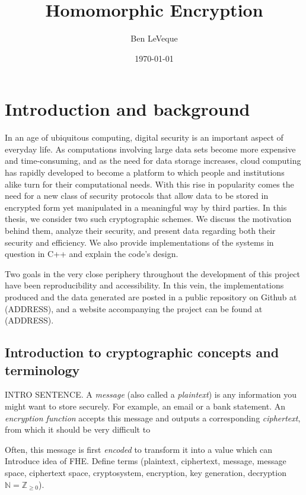 \documentclass[11pt]{report}
\title{Homomorphic Encryption}
\author{Ben LeVeque}
\date{\today}
\newcommand{\Z}{\mathbb{Z}}
\newcommand{\N}{\mathbb{N}}
\begin{document}
\maketitle


\tableofcontents

\newpage

\section[Intro]{Introduction and background}

In an age of ubiquitous computing, digital security is an important aspect of everyday life. As computations involving large data sets become more expensive and time-consuming, and as the need for data storage increases, cloud computing has rapidly developed to become a platform to which people and institutions alike turn for their computational needs. With this rise in popularity comes the need for a new class of security protocols that allow data to be stored in encrypted form yet manipulated in a meaningful way by third parties. In this thesis, we consider two such cryptographic schemes. We discuss the motivation behind them, analyze their security, and present data regarding both their security and efficiency. We also provide implementations of the systems in question in C++ and explain the code's design.

Two goals in the very close periphery throughout the development of this project have been reproducibility and accessibility. In this vein, the implementations produced and the data generated are posted in a public repository on Github at (ADDRESS), and a website accompanying the project can be found at (ADDRESS).

\subsection{Introduction to cryptographic concepts and terminology} 

INTRO SENTENCE. A \emph{message} (also called a \emph{plaintext}) is any information you might want to store securely. For example, an email or a bank statement. An \emph{encryption function} accepts this message and outputs a corresponding \emph{ciphertext}, from which it should be very difficult to 

Often, this message is first \emph{encoded} to transform it into a value which can 
Introduce idea of FHE. Define terms (plaintext, ciphertext, message, message space, ciphertext space, cryptosystem, encryption, key generation, decryption $\N=\Z_{\geq 0}$).
\end{document}
